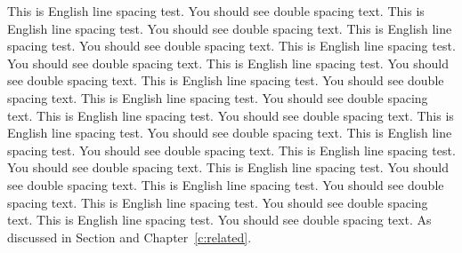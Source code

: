 This is English line spacing test. You should see double spacing text.
This is English line spacing test. You should see double spacing text.
This is English line spacing test. You should see double spacing text.
This is English line spacing test. You should see double spacing text.
This is English line spacing test. You should see double spacing text.
This is English line spacing test. You should see double spacing text.
This is English line spacing test. You should see double spacing text.
This is English line spacing test. You should see double spacing text.
This is English line spacing test. You should see double spacing text.
This is English line spacing test. You should see double spacing text.
This is English line spacing test. You should see double spacing text.
This is English line spacing test. You should see double spacing text.
This is English line spacing test. You should see double spacing text.
This is English line spacing test. You should see double spacing text.
This is English line spacing test. You should see double spacing text.
As discussed in Section and Chapter~\ref{c:related}.
